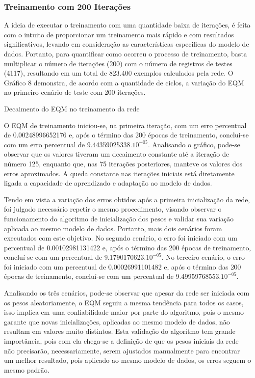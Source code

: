 \subsubsection{Treinamento com 200 Iterações}	
A ideia de executar o treinamento com uma quantidade baixa de iterações, é feita com o intuito de proporcionar um treinamento mais rápido e com resultados significativos, levando em consideração as características especificas do modelo de dados. Portanto, para quantificar como ocorreu o processo de treinamento, basta multiplicar o número de iterações (200) com o número de registros de testes (4117), resultando em um total de 823.400 exemplos calculados pela rede. O Gráfico 8 demonstra, de acordo com a quantidade de ciclos, a variação do EQM no primeiro cenário de teste com 200 iterações.
\begin{grafico}[h]
	\centering
	\caption{Decaimento do EQM no treinamento da rede}
	\label{lingua}
\end{grafico}

O EQM de treinamento iniciou-se, na primeira iteração, com um erro percentual de 0.00248996652176 e, após o término das 200 épocas de treinamento, conclui-se com um erro percentual de 9.44359025338.$10^{-05}$. Analisando o gráfico, pode-se observar que os valores tiveram um decaimento constante até a iteração de número 125, enquanto que, nas 75 iterações posteriores, manteve os valores dos erros aproximados. A queda constante nas iterações iniciais está diretamente ligada a capacidade de aprendizado e adaptação ao modelo de dados.

Tendo em vista a variação dos erros obtidos após a primeira inicialização da rede, foi julgado necessário repetir o mesmo procedimento, visando observar o funcionamento do algoritmo de inicialização dos pesos e validar sua variação aplicada ao mesmo modelo de dados. Portanto, mais dois cenários foram executados com este objetivo. No segundo cenário, o erro foi iniciado com um percentual de 0.00102981131422 e, após o término das 200 épocas de treinamento, concluí-se com um percentual de 9.1790170623.$10^{-05}$. No terceiro cenário, o erro foi iniciado com um percentual de 0.00026991101482 e, após o término das 200 épocas de treinamento, concluí-se com um percentual de 9.49959768553.$10^{-05}$.

Analisando os três cenários, pode-se observar que apesar da rede ser iniciada com os pesos aleatoriamente, o EQM seguiu a mesma tendência para todos os casos, isso implica em uma confiabilidade maior por parte do algoritmo, pois o mesmo garante que novas inicializações, aplicadas ao mesmo modelo de dados, não resultam em valores muito distintos. Esta validação do algoritmo tem grande importância, pois com ela chega-se a definição de que os pesos iniciais da rede não precisarão, necessariamente, serem ajustados manualmente para encontrar um melhor resultado, pois aplicado ao mesmo modelo de dados, os erros seguem o mesmo padrão.

